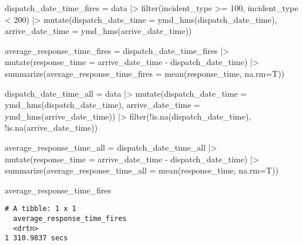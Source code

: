 \documentclass[
  letterpaper,
  DIV=11,
  numbers=noendperiod]{scrartcl}
\newenvironment{Shaded}{\begin{snugshade}}{\end{snugshade}}
\newcommand{\AttributeTok}[1]{\textcolor[rgb]{0.40,0.45,0.13}{#1}}
\newcommand{\DecValTok}[1]{\textcolor[rgb]{0.68,0.00,0.00}{#1}}
\newcommand{\FunctionTok}[1]{\textcolor[rgb]{0.28,0.35,0.67}{#1}}
\newcommand{\NormalTok}[1]{\textcolor[rgb]{0.00,0.23,0.31}{#1}}
\newcommand{\OtherTok}[1]{\textcolor[rgb]{0.00,0.23,0.31}{#1}}
\newcommand{\SpecialCharTok}[1]{\textcolor[rgb]{0.37,0.37,0.37}{#1}}
\begin{document}
\begin{Shaded}
\begin{Highlighting}[]
\NormalTok{dispatch\_date\_time\_fires }\OtherTok{=}\NormalTok{ data }\SpecialCharTok{|\textgreater{}}
   \FunctionTok{filter}\NormalTok{(incident\_type }\SpecialCharTok{\textgreater{}=} \DecValTok{100}\NormalTok{, incident\_type }\SpecialCharTok{\textless{}} \DecValTok{200}\NormalTok{) }\SpecialCharTok{|\textgreater{}}
   \FunctionTok{mutate}\NormalTok{(}\AttributeTok{dispatch\_date\_time =} \FunctionTok{ymd\_hms}\NormalTok{(dispatch\_date\_time), }\AttributeTok{arrive\_date\_time =} \FunctionTok{ymd\_hms}\NormalTok{(arrive\_date\_time)) }
  
  
\NormalTok{average\_response\_time\_fires }\OtherTok{=}\NormalTok{ dispatch\_date\_time\_fires }\SpecialCharTok{|\textgreater{}}
  \FunctionTok{mutate}\NormalTok{(}\AttributeTok{response\_time =}\NormalTok{ arrive\_date\_time }\SpecialCharTok{{-}}\NormalTok{ dispatch\_date\_time) }\SpecialCharTok{|\textgreater{}}
  \FunctionTok{summarize}\NormalTok{(}\AttributeTok{average\_response\_time\_fires =} \FunctionTok{mean}\NormalTok{(response\_time, }\AttributeTok{na.rm=}\NormalTok{T)) }

\NormalTok{dispatch\_date\_time\_all }\OtherTok{=}\NormalTok{ data }\SpecialCharTok{|\textgreater{}}
   \FunctionTok{mutate}\NormalTok{(}\AttributeTok{dispatch\_date\_time =} \FunctionTok{ymd\_hms}\NormalTok{(dispatch\_date\_time), }\AttributeTok{arrive\_date\_time =} \FunctionTok{ymd\_hms}\NormalTok{(arrive\_date\_time)) }\SpecialCharTok{|\textgreater{}}
  \FunctionTok{filter}\NormalTok{(}\SpecialCharTok{!}\FunctionTok{is.na}\NormalTok{(dispatch\_date\_time), }\SpecialCharTok{!}\FunctionTok{is.na}\NormalTok{(arrive\_date\_time)) }
  
\NormalTok{  average\_response\_time\_all }\OtherTok{=}\NormalTok{ dispatch\_date\_time\_all }\SpecialCharTok{|\textgreater{}}
    \FunctionTok{mutate}\NormalTok{(}\AttributeTok{response\_time =}\NormalTok{ arrive\_date\_time }\SpecialCharTok{{-}}\NormalTok{ dispatch\_date\_time) }\SpecialCharTok{|\textgreater{}}
    \FunctionTok{summarize}\NormalTok{(}\AttributeTok{average\_response\_time\_all =} \FunctionTok{mean}\NormalTok{(response\_time, }\AttributeTok{na.rm=}\NormalTok{T))}
  
\NormalTok{  average\_response\_time\_fires}
\end{Highlighting}
\end{Shaded}

\begin{verbatim}
# A tibble: 1 x 1
  average_response_time_fires
  <drtn>                     
1 310.9837 secs              
\end{verbatim}
\end{document}
